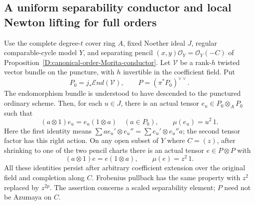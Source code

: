 \subsection{A uniform separability conductor and local Newton lifting for full orders}

\begin{lemma}
\label{D:full-order-scaled-separability}
Use the complete degree-$t$ cover ring $A$, fixed Noether ideal $J$,
regular comparable-cycle model $Y$, and separating pencil
$(x,y)\mathcal O_Y=\mathcal O_Y(-C)$ of
Proposition~\ref{D:canonical-order-Morita-conductor}.
Let $\mathcal V$ be a rank-$h$ twisted vector bundle on the puncture,
with $h$ invertible in the coefficient field. Put
\[
 P_0=j_*\mathcal End(\mathcal V),\qquad
 P=(\pi^*P_0)^{\vee\vee}.
                                                        \tag{D.SN.1}
\]
The endomorphism bundle is understood to have descended to the
punctured ordinary scheme. Then, for each $u\in J$, there is an
actual tensor $e_u\in P_0\otimes_A P_0$ such that
\[
 (a\otimes1)e_u=e_u(1\otimes a)\quad(a\in P_0),
 \qquad \mu(e_u)=u^2\,1.
                                                        \tag{D.SN.2}
\]
Here the first identity means
$\sum a e_u'\otimes e_u''=\sum e_u'\otimes e_u''a$;
the second tensor factor has this right action.
On any open subset of $Y$ where $C=(z)$, after shrinking to one
of the two pencil charts there is an actual tensor
$e\in P\otimes P$ with
\[
             (a\otimes1)e=e(1\otimes a),\qquad
                         \mu(e)=z^2\,1.                \tag{D.SN.3}
\]
All these identities persist after arbitrary coefficient extension
over the original field and completion along $C$. Frobenius
pullback has the same property with $z^2$ replaced by $z^{2p}$.
The assertion concerns a scaled separability element; $P$ need
not be Azumaya on $C$.
\end{lemma}

